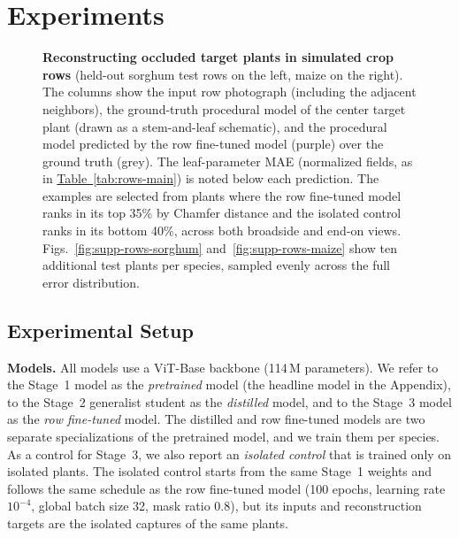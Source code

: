 \documentclass[10pt,twocolumn,letterpaper]{article}
\newcommand{\tabref}[1]{\hyperref[#1]{Table~\ref*{#1}}}
\begin{document}
\section{Experiments}
\label{sec:results}\label{sec:experiments}

\begin{figure}[t]
  \centering
  \resizebox{\linewidth}{!}{}
    \vspace{-15pt}

  \caption{\textbf{Reconstructing occluded target plants in simulated crop rows} (held-out sorghum test rows on the left, maize on the right). The columns show the input row photograph (including the adjacent neighbors), the ground-truth procedural model of the center target plant (drawn as a stem-and-leaf schematic), and the procedural model predicted by the row fine-tuned model (purple) over the ground truth (grey). The leaf-parameter MAE (normalized fields, as in \tabref{tab:rows-main}) is noted below each prediction. The examples are selected from plants where the row fine-tuned model ranks in its top 35\% by Chamfer distance and the isolated control ranks in its bottom 40\%, across both broadside and end-on views. \textcolor{cvprblue}{Figs.}~\ref{fig:supp-rows-sorghum} and~\ref{fig:supp-rows-maize} show ten additional test plants per species, sampled evenly across the full error distribution.}
  \label{fig:rowsex}
\end{figure}

\subsection{Experimental Setup}
\label{sec:setup}\label{sec:exp-setup}

\noindent\textbf{Models.}
All models use a ViT-Base backbone (114\,M parameters). We refer to the Stage~1 model as the \emph{pretrained} model (the headline model in the Appendix), to the Stage~2 generalist student as the \emph{distilled} model, and to the Stage~3 model as the \emph{row fine-tuned} model. The distilled and row fine-tuned models are two separate specializations of the pretrained model, and we train them per species. As a control for Stage~3, we also report an \emph{isolated control} that is trained only on isolated plants. The isolated control starts from the same Stage~1 weights and follows the same schedule as the row fine-tuned model (100 epochs, learning rate $10^{-4}$, global batch size 32, mask ratio 0.8), but its inputs and reconstruction targets are the isolated captures of the same plants.
\end{document}
